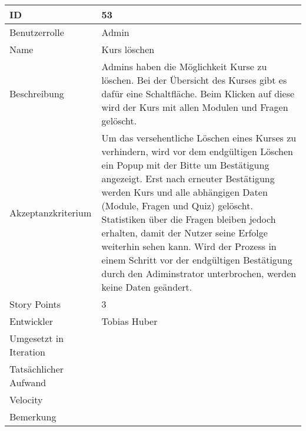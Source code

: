 \begin{tabularx}{\textwidth}{|p{}|X|}
	\hline
	ID & 53\\
	\hline
	Benutzerrolle & Admin\\
	\hline
	Name & Kurs löschen\\
	\hline
	Beschreibung & Admins haben die Möglichkeit Kurse zu löschen. Bei der Übersicht des Kurses
	gibt es dafür eine Schaltfläche. Beim Klicken auf diese wird der Kurs mit allen Modulen
	und Fragen gelöscht.\\
	\hline
	Akzeptanzkriterium & Um das versehentliche Löschen eines Kurses zu verhindern, wird vor dem
	endgültigen Löschen ein Popup mit der Bitte um Bestätigung angezeigt. Erst nach erneuter
	Bestätigung werden Kurs und alle abhängigen Daten (Module, Fragen und Quiz) gelöscht.
	Statistiken über die Fragen bleiben jedoch erhalten, damit der Nutzer seine Erfolge
	weiterhin sehen kann. Wird der Prozess in einem Schritt vor der endgültigen Bestätigung
	durch den Adiminstrator unterbrochen, werden keine Daten geändert.\\
	\hline
	Story Points & 3\\
	\hline
	Entwickler & Tobias Huber\\
	\hline
	Umgesetzt in Iteration & \\ 
	\hline
	Tatsächlicher Aufwand & \\
	\hline
	Velocity & \\
	\hline
	Bemerkung & \\
	\hline
\end{tabularx}
\vspace{20pt}

